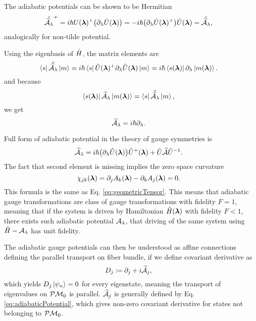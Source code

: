 The adiabatic potentials can be shown to be Hermitian
\begin{equation}
     \tilde{\AA_\lambda}^+=i\hbar U(\llambda)^+\big(\partial_\lambda\U(\llambda)\big)=-i\hbar\big(\partial_\lambda\U(\llambda)^+\big)\U(\llambda) = \tilde{\AA_\lambda},
     \label{eq:counterdiabaticPotentialTwoSystems}
\end{equation}
analogically for non-tilde potential.

Using the eigenbasis of $\HH$, the matrix elements are
\begin{equation}
    \bra{s}\tilde{\AA_\lambda}\ket{m}=i\hbar\bra{s}\U(\llambda)^+\partial_\lambda\U(\llambda)\ket{m} = i\hbar\bra{s(\llambda)}\partial_\lambda\ket{m(\llambda)}.
\end{equation}
and because
\begin{equation}
    \bra{s(\llambda)}\AA_\lambda\ket{ m(\llambda)}= \bra{s}\tilde{\AA_\lambda}\ket{m},
\end{equation}
we get
\begin{equation}
    \AA_\lambda = i\hbar\partial_\lambda.
    \label{eq:adiabaticPotentialDefinition}
\end{equation}



Full form of adiabatic potential in the theory of gauge symmetries is
\begin{equation}
    \AA_\lambda=i\hbar \big(\partial_\lambda \U(\llambda)\big)\U^+(\llambda) + \U \AA \U^{-1}.
\end{equation}
The fact that second element is missing implies the zero space curvature
\begin{equation}
    \chi_{jk}(\llambda) = \partial_j A_k(\llambda)-\partial_k A_j(\llambda) = 0.
\end{equation}
This formula is the same as Eq. \ref{eq:geometricTensor}. This means that adiabatic gauge transformations are class of gauge transformations with fidelity $F=1$, meaning that if the system is driven by Hamiltonian $\HH(\llambda)$ with fidelity $F<1$, there exists such adiabatic potential $\A_\lambda$, that driving of the same system using $\HH-\A_\lambda$ has unit fidelity.

The adiabatic gauge potentials can then be understood as affine connections defining the parallel transport on fiber bundle, if we define covariant derivative as
\begin{equation}
    D_j\coloneqq\partial_j+i\AA_j,
\end{equation}
which yields $D_j\ket{\psi_n}=0$ for every eigenstate, meaning the transport of eigenvalues on $\P\M_0$ is parallel. $\AA_j$ is generally defined by Eq. \ref{eq:adiabaticPotential}, which gives non-zero covariant derivative for states not belonging to $\P\M_0$. 

